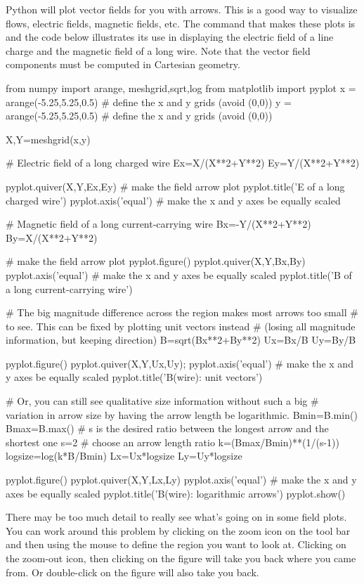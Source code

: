 Python will plot vector fields for you with arrows. This is a good
way to visualize flows, electric fields, magnetic fields, etc. The
command that makes these plots is  and the code below
illustrates its use in displaying the electric field of a line
charge and the magnetic field of a long wire.  Note that the vector
field components must be computed in Cartesian geometry.
\begin{codeexample}
\begin{VerbatimOut}{\listingFile}
from numpy import arange, meshgrid,sqrt,log
from matplotlib import pyplot
x = arange(-5.25,5.25,0.5) # define the x and y grids (avoid (0,0))
y = arange(-5.25,5.25,0.5) # define the x and y grids (avoid (0,0))

X,Y=meshgrid(x,y)

# Electric field of a long charged wire
Ex=X/(X**2+Y**2)
Ey=Y/(X**2+Y**2)

pyplot.quiver(X,Y,Ex,Ey) # make the field arrow plot
pyplot.title('E of a long charged wire')
pyplot.axis('equal')  # make the x and y axes be equally scaled

# Magnetic field of a long current-carrying wire
Bx=-Y/(X**2+Y**2)
By=X/(X**2+Y**2)

# make the field arrow plot
pyplot.figure()
pyplot.quiver(X,Y,Bx,By)
pyplot.axis('equal')  # make the x and y axes be equally scaled
pyplot.title('B of a long current-carrying wire')

# The big magnitude difference across the region makes most arrows too small
# to see.  This can be fixed by plotting unit vectors instead
# (losing all magnitude information, but keeping direction)
B=sqrt(Bx**2+By**2)
Ux=Bx/B
Uy=By/B

pyplot.figure()
pyplot.quiver(X,Y,Ux,Uy);
pyplot.axis('equal')  # make the x and y axes be equally scaled
pyplot.title('B(wire): unit vectors')

# Or, you can still see qualitative size information without such a big
# variation in arrow size by having the arrow length be logarithmic.
Bmin=B.min()
Bmax=B.max()
# s is the desired ratio between the longest arrow and the shortest one
s=2  # choose an arrow length ratio
k=(Bmax/Bmin)**(1/(s-1))
logsize=log(k*B/Bmin)
Lx=Ux*logsize
Ly=Uy*logsize

pyplot.figure()
pyplot.quiver(X,Y,Lx,Ly)
pyplot.axis('equal')  # make the x and y axes be equally scaled
pyplot.title('B(wire): logarithmic arrows')
pyplot.show()
\end{VerbatimOut}
\end{codeexample}
 There may be too much detail to really see
what's going on in some field plots. You can work around this
problem by clicking on the zoom icon on the tool bar and then using
the mouse to define the region you want to look at. Clicking on the
zoom-out icon, then clicking on the figure will take you back where
you came from. Or double-click on the figure will also take you
back.

